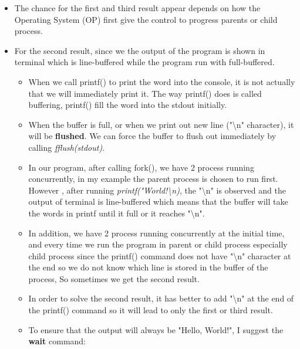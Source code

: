\documentclass[a4paper]{article}
\begin{document}
\begin{enumerate}
    \begin{itemize}
        \item The chance for the first and third result appear depends on how the Operating System (OP) first give the control to progress parents or child process.
        \item For the second result, since we the output of the program is shown in terminal which is line-buffered while the program run with full-buffered.
        \begin{itemize}
            \item When we call printf() to print the word into the console, it is not actually that we will immediately print it. The way printf() does is called buffering, printf() fill the word into the stdout initially.
            \item When the buffer is full, or when we print out new line ("\textbackslash n" character), it will be \textbf{flushed}. We can force the buffer to flush out immediately by calling \textit{fflush(stdout)}.
            \item In our program, after calling fork(), we have 2 process running concurrently, in my example the parent process is chosen to run first. However , after running \textit{printf("World!\textbackslash n)}, the "\textbackslash n" is observed and the output of terminal is line-buffered which means that the buffer will take the words in printf until it full or it reaches "\textbackslash n".
            \item In addition, we have 2 process running concurrently at the initial time, and every time we run the program in parent or child process especially child process since the printf() command does not have "\textbackslash n" character at the end so we do not know which line is stored in the buffer of the process, So sometimes we get the second result.
            \item In order to solve the second result, it has better to add "\textbackslash n" at the end of the printf() command so it will lead to only the first or third result.
            \item To ensure that the output will always be "Hello, World!", I suggest the \textbf{wait} command:
            \bigbreak

\end{itemize}
\end{itemize}
\end{enumerate}
\end{document}
